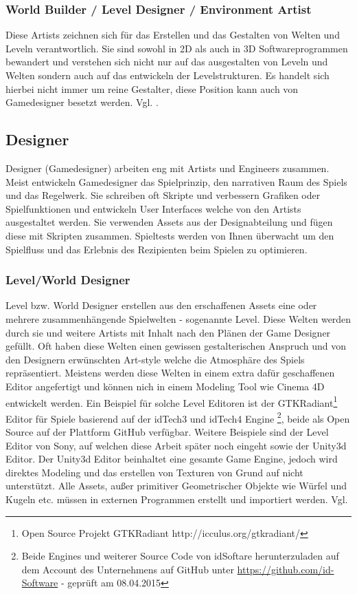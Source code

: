 \documentclass[pagesize, paper=a4, fontsize=12pt, titlepage=true, headings=small, headnosepline, abstractoff, liststotoc, nochapterprefix, plainheadsepline, twoside]{scrreprt}
\begin{document}
\subsubsection{World Builder / Level Designer / Environment Artist}
Diese Artists zeichnen sich für das Erstellen und das Gestalten von Welten und Leveln verantwortlich. Sie sind sowohl in 2D als auch in 3D Softwareprogrammen bewandert und verstehen sich nicht nur auf das ausgestalten von Leveln und Welten sondern auch auf das entwickeln der Levelstrukturen. Es handelt sich hierbei nicht immer um reine Gestalter, diese Position kann auch von Gamedesigner besetzt werden. Vgl. \parencite[S. 24]{Chandler2006}.

\subsection{Designer}
Designer (Gamedesigner) arbeiten eng mit Artists und Engineers zusammen. Meist entwickeln Gamedesigner das Spielprinzip, den narrativen Raum des Spiels und das Regelwerk. Sie schreiben oft Skripte und verbessern Grafiken oder Spielfunktionen und entwickeln User Interfaces welche von den Artists ausgestaltet werden. Sie verwenden Assets aus der Designabteilung und fügen diese mit Skripten zusammen. Spieltests werden von Ihnen überwacht um den Spielfluss und das Erlebnis des Rezipienten beim Spielen zu optimieren.
\subsubsection{Level/World Designer}
Level bzw. World Designer erstellen aus den erschaffenen Assets eine oder mehrere zusammenhängende Spielwelten - sogenannte Level. Diese Welten werden durch sie und weitere Artists mit Inhalt nach den Plänen der Game Designer gefüllt. Oft haben diese Welten einen gewissen gestalterischen Anspruch und von den Designern erwünschten Art-style welche die Atmosphäre des Spiels repräsentiert. Meistens werden diese Welten in einem extra dafür geschaffenen Editor angefertigt und können nich in einem Modeling Tool wie Cinema 4D entwickelt werden. Ein Beispiel für solche Level Editoren ist der GTKRadiant\footnote{Open Source Projekt GTKRadiant http://icculus.org/gtkradiant/} Editor für Spiele basierend auf der idTech3 und idTech4  Engine \footnote{Beide Engines und weiterer Source Code von idSoftare herunterzuladen auf dem Account des Unternehmens auf GitHub unter \url{https://github.com/id-Software} - geprüft am 08.04.2015}, beide als Open Source auf der Plattform GitHub verfügbar. Weitere Beispiele sind der Level Editor von Sony, auf welchen diese Arbeit später noch eingeht sowie der Unity3d Editor. Der Unity3d Editor beinhaltet eine gesamte Game Engine, jedoch wird direktes Modeling und das erstellen von Texturen von Grund auf nicht unterstützt. Alle Assets, außer primitiver Geometrischer Objekte wie Würfel und Kugeln etc. müssen in externen Programmen erstellt und importiert werden. Vgl. \parencite[S. 31 ]{Chandler2006}
\end{document}
